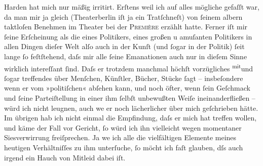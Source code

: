 \pstart
           {\pb}Harden hat mich nur mäßig irritirt. Erſtens
               weil ich auf alles mögliche gefaſſt war, da man mir ja gleich (Theaterberlin iſt ja ein Tratſchneſt) von ſeinem albern
               taktloſen Benehmen im Theater bei der \textsc{Première} erzählt hatte. Ferner iſt mir ſeine Erſcheinung als die eines Politikers, eines
               großen u amuſanten Politikers in allen Dingen dieſer Welt alſo auch in der Kunſt (und
               ſogar in der Politik) ſeit lange ſo feſtſtehend, {\pb}daſs
               mir alle ſeine Emanationen auch nur in dieſem Sinne wirklich intereſſant ſind. Daſs
               er trotzdem manchmal höchſt vorzügliches \substVorne{}\textsuperscript{mit}\substDazwischen{}und\substHinten{}{ } ſogar treffendes über Menſchen, Künſtler,
               Bücher, Stücke ſagt – insbeſondere wenn er vom »politiſchen« abſehen kann, und noch
               öfter, wenn ſein Geſchmack und ſeine Parteiſtellung in einer ihm ſelbſt unbewußten
               Weiſe ineinanderfließen – würd ich nicht leugnen, auch we{\geminationn} er noch lächerlicher über mich geſchrie{\pb}ben hätte. Im übrigen hab ich nicht
               einmal die Empfindung, daſs er mich hat treffen wollen, und käme der Fall vor
               Gericht, ſo würd ich ihn vielleicht wegen momentaner Si{\geminationn}esverwirrung freiſprechen. Ja we{\geminationn} ich alle die
               vielfältigen Elemente meines heutigen Verhältniſſes zu ihm unterſuche, ſo möcht ich
               faſt glauben, dſs auch irgend ein Hauch von Mitleid dabei iſt.\pend
           
